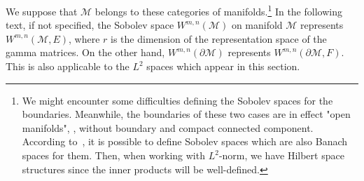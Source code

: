 We suppose that $\mathcal{M}$ belongs to these categories of manifolds.\footnote{
We might encounter some difficulties defining the Sobolev spaces for the boundaries. Meanwhile, the boundaries of these two cases are in effect "open manifolds", \ie, without boundary and compact connected component. 
According to~\cite{Eichhorn1996}, it is possible to define Sobolev spaces which are also Banach spaces for them.
Then, when working with $L^2$-norm, we have Hilbert space structures since the inner products will be well-defined.  
}
In the following text, if not specified, the Sobolev space $W^{m,n}(\mathcal{M})$ on manifold $\mathcal{M}$ represents $W^{m,n}(\mathcal{M}, E)$, where $r$ is the dimension of the representation space of the gamma matrices. 
On the other hand, $W^{m,n}(\partial \mathcal{M})$ represents $W^{m,n}(\partial \mathcal{M}, F)$.
This is also applicable to the $L^2$ spaces which appear in this section. 
%

